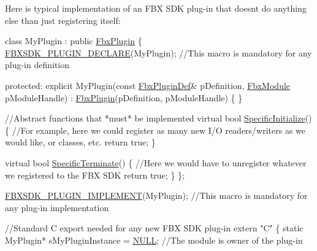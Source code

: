 Here is typical implementation of an F\+BX S\+DK plug-\/in that doesn\textquotesingle{}t do anything else than just registering itself\+: 
\begin{DoxyCode}
\textcolor{keyword}{class }MyPlugin : \textcolor{keyword}{public} \hyperlink{class_fbx_plugin}{FbxPlugin}
\{
    \hyperlink{fbxplugin_8h_a82867e434a2a4a1b8f16632928649b07}{FBXSDK\_PLUGIN\_DECLARE}(MyPlugin); \textcolor{comment}{//This macro is mandatory for any plug-in
       definition}

\textcolor{keyword}{protected}:
    \textcolor{keyword}{explicit} MyPlugin(\textcolor{keyword}{const} \hyperlink{struct_fbx_plugin_def}{FbxPluginDef}& pDefinition, \hyperlink{fbxmodule_8h_a1d2ed3e9ccb8075d585f7cb7bdf40420}{FbxModule} pModuleHandle) : 
      \hyperlink{class_fbx_plugin}{FbxPlugin}(pDefinition, pModuleHandle)
    \{
    \}

    \textcolor{comment}{//Abstract functions that *must* be implemented}
    \textcolor{keyword}{virtual} \textcolor{keywordtype}{bool} \hyperlink{class_fbx_plugin_a5b6ba0af2c0cf8a7d5cb1680407d9e7e}{SpecificInitialize}()
    \{
        \textcolor{comment}{//For example, here we could register as many new I/O readers/writers as we would like, or classes,
       etc.}
        \textcolor{keywordflow}{return} \textcolor{keyword}{true};
    \}

    \textcolor{keyword}{virtual} \textcolor{keywordtype}{bool} \hyperlink{class_fbx_plugin_ade394d2752689a4690a29b34d347446e}{SpecificTerminate}()
    \{
        \textcolor{comment}{//Here we would have to unregister whatever we registered to the FBX SDK}
        \textcolor{keywordflow}{return} \textcolor{keyword}{true};
    \}
\};

\hyperlink{fbxplugin_8h_a94a72a1e3b950d4d488f036a4f7f35bb}{FBXSDK\_PLUGIN\_IMPLEMENT}(MyPlugin); \textcolor{comment}{//This macro is mandatory for any plug-in
       implementation}

\textcolor{comment}{//Standard C export needed for any new FBX SDK plug-in}
\textcolor{keyword}{extern} \textcolor{stringliteral}{"C"}
\{
    \textcolor{keyword}{static} MyPlugin* sMyPluginInstance = \hyperlink{fbxarch_8h_a070d2ce7b6bb7e5c05602aa8c308d0c4}{NULL}; \textcolor{comment}{//The module is owner of the plug-in}


\end{DoxyCode}
